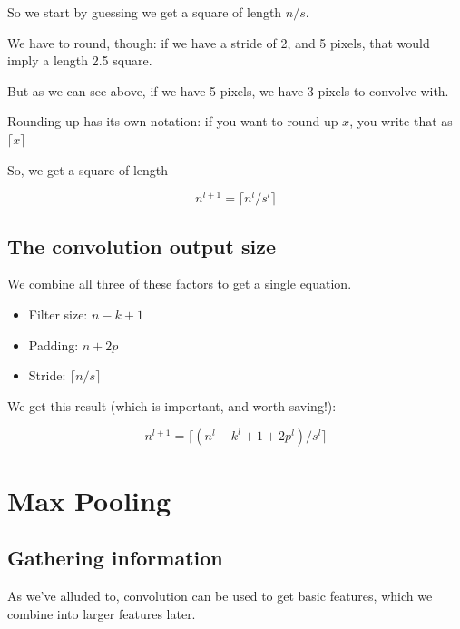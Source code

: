         So we start by guessing we get a square of length $n/s$.
        
        We have to round, though: if we have a stride of 2, and 5 pixels, that would imply a length 2.5 square.
        
        But as we can see above, if we have 5 pixels, we have 3 pixels to convolve with.
        
        Rounding up has its own notation: if you want to round up $x$, you write that as $\lceil x \rceil$
        
        So, we get a square of length 
        
        \begin{equation*}
            n^{l+1} =\lceil n^l/s^l \rceil
        \end{equation*}
    
    \subsection{The convolution output size}
    
        We combine all three of these factors to get a single equation.
        
        \begin{itemize}
            \item Filter size: $n-k+1$
            \item Padding: $n+2p$
            \item Stride: $\lceil n/s \rceil$
        \end{itemize}
        
        We get this result (which is important, and worth saving!):
        
        \begin{equation*}
            n^{l+1} = \lceil ( n^l - k^l + 1 + 2p^l)/s^l \rceil
        \end{equation*}
        
        
        

\section{Max Pooling}

    \subsection{Gathering information}
    
        As we've alluded to, convolution can be used to get basic features, which we combine into larger features later.
        
